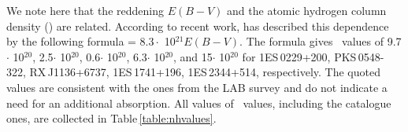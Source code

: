 We note here  that the reddening $E(B-V)$ and the atomic hydrogen column density (\nh) are related.
 According to recent work, \cite{Liszt2014} has described this dependence by the following formula \nh = $8.3 \cdot$ 10$^{21}E(B-V)$.
The formula gives \nh\ values of 9.7$\cdot$ 10$^{20}$, 2.5$\cdot$ 10$^{20}$, 0.6$\cdot$ 10$^{20}$, 6.3$\cdot$ 10$^{20}$, and 15$\cdot$ 10$^{20}$ for  1ES\,0229+200, PKS\,0548-322, RX\,J1136+6737, 1ES\,1741+196, 1ES\,2344+514, respectively. 
The quoted values are consistent with the ones from the LAB survey and do not indicate a need for an additional absorption.
All values of \nh\ values, including the catalogue ones, are collected in Table\,\ref{table:nhvalues}. 


